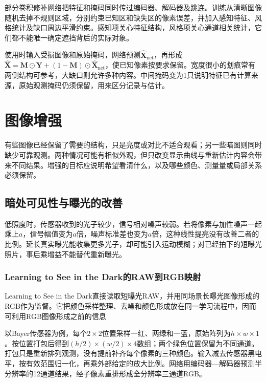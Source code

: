部分卷积修补网络把特征和掩码同时传过编码器、解码器及跳连。训练从清晰图像随机去掉不规则区域，分别约束已知区和缺失区的像素误差，并加入感知特征、风格统计及缺口周边平滑约束。感知项关心特征结构，风格项关心通道相关统计，它们都不能唯一确定遮挡背后的实际对象。

使用时输入受损图像和原始掩码，网络预测$\widehat{\bm{X}}_{\mathrm{net}}$，再形成
$\widehat{\bm{X}}=\bm{M}\odot\bm{Y}+(1-\bm{M})\odot\widehat{\bm{X}}_{\mathrm{net}}$，使已知像素按要求保留。宽度很小的划痕常有两侧结构可参考，大缺口则允许多种内容。中间掩码变为1只说明特征已有计算来源，原始观测掩码仍须保留，用来区分记录与估计。

\section{图像增强}
\label{sec:vision-restoration-enhancement}

有些图像已经保留了需要的结构，只是亮度或对比不适合观看；另一些暗图则同时缺少可靠观测。两种情况可能有相似外观，但只改变显示曲线与重新估计内容会带来不同结果。增强的目标应说明希望看清什么，以及哪些颜色、测量量或局部关系必须保留。

\subsection{暗处可见性与曝光的改善}
\label{sec:vision-restoration-low-light}

低照度时，传感器收到的光子较少，信号相对噪声较弱。若将像素与加性噪声一起乘上$a$，信号幅值变为$a$倍，噪声标准差也变为$a$倍，这种线性提亮没有改善二者的比例。延长真实曝光能收集更多光子，却可能引入运动模糊；对已经拍下的短曝光照片，事后乘增益不能替代重新曝光。

\subsubsection{Learning to See in the Dark的RAW到RGB映射}
\label{sec:vision-restoration-sid}

Learning to See in the Dark直接读取短曝光RAW，并用同场景长曝光图像形成的RGB作为监督。它把颜色采样整理、去噪和颜色形成放在同一学习流程中，因而可利用RGB图像形成之前的信息

以Bayer传感器为例，每个$2\times2$位置采样一红、两绿和一蓝，原始阵列为$h\times w\times1$。按位置打包后得到$(h/2)\times(w/2)\times4$数组；两个绿色位置保留为不同通道。打包只是重新排列观测，没有提前补齐每个像素的三种颜色。输入减去传感器黑电平，按有效范围归一化，再乘外部给定的放大比例。网络用编码器—解码器预测半分辨率的12通道结果，经子像素重排形成全分辨率三通道RGB。

